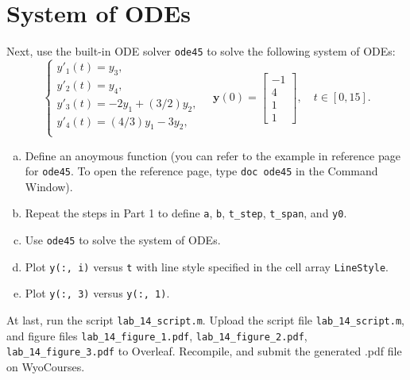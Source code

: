 \section{System of ODEs}
Next, use the built-in ODE solver \verb`ode45` to solve the following system of ODEs:
$$
\begin{cases}
    y'_1(t) = y_3, \\
    y'_2(t) = y_4, \\
    y'_3(t) = -2 y_1 + (3/2) y_2, \\
    y'_4(t) = (4/3) y_1 - 3 y_2, \\
\end{cases}
\quad
\mathbf{y}(0) =
\begin{bmatrix}
    -1 \\ 4 \\ 1 \\ 1
\end{bmatrix},
\quad
t \in [0, 15].
$$
\begin{enumerate}[(a)]
    \item Define an anoymous function (you can refer to the example in reference page for \verb`ode45`. To open the reference page, type \verb`doc ode45` in the Command Window).
    \item Repeat the steps in Part 1 to define \verb`a`, \verb`b`, \verb`t_step`, \verb`t_span`, and \verb`y0`.
    \item Use \verb`ode45` to solve the system of ODEs.
    \item Plot \verb`y(:, i)` versus \verb`t` with line style specified in the cell array \verb`LineStyle`.
    \item Plot \verb`y(:, 3)` versus \verb`y(:, 1)`.
\end{enumerate}
At last, run the script \verb|lab_14_script.m|. Upload the script file \verb|lab_14_script.m|, and figure files \verb|lab_14_figure_1.pdf|, \verb|lab_14_figure_2.pdf|, \verb|lab_14_figure_3.pdf| to Overleaf. Recompile, and submit the generated .pdf file on WyoCourses.

